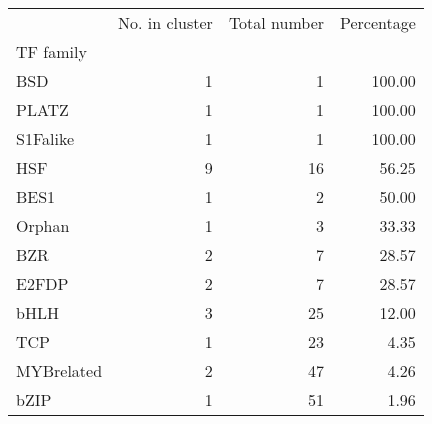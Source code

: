 \begin{tabular}{lrrr}
\toprule
{} &  No. in cluster &  Total number &  Percentage \\
TF family  &                 &               &             \\
\midrule
BSD        &               1 &             1 &      100.00 \\
PLATZ      &               1 &             1 &      100.00 \\
S1Falike   &               1 &             1 &      100.00 \\
HSF        &               9 &            16 &       56.25 \\
BES1       &               1 &             2 &       50.00 \\
Orphan     &               1 &             3 &       33.33 \\
BZR        &               2 &             7 &       28.57 \\
E2FDP      &               2 &             7 &       28.57 \\
bHLH       &               3 &            25 &       12.00 \\
TCP        &               1 &            23 &        4.35 \\
MYBrelated &               2 &            47 &        4.26 \\
bZIP       &               1 &            51 &        1.96 \\
\bottomrule
\end{tabular}
